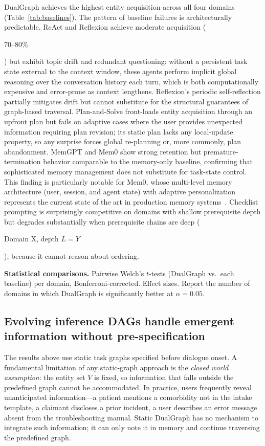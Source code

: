 \documentclass[11pt,a4paper]{article}
\newcommand{\placeholder}[1]{%
  \begin{tcolorbox}[colback=yellow!10,colframe=orange!60!black,
    fonttitle=\bfseries,title=Placeholder]
    #1
  \end{tcolorbox}%
}
\begin{document}
DualGraph achieves the highest entity acquisition across all four domains
(Table~\ref{tab:baselines}). The pattern of baseline failures is
architecturally predictable.
ReAct and Reflexion achieve moderate acquisition (\placeholder{70--80\%}) but
exhibit topic drift and redundant questioning: without a persistent task
state external to the context window, these agents perform implicit global
reasoning over the conversation history each turn, which is both
computationally expensive and error-prone as context lengthens. Reflexion's
periodic self-reflection partially mitigates drift but cannot substitute for
the structural guarantees of graph-based traversal.
Plan-and-Solve front-loads entity acquisition through an upfront plan but
fails on adaptive cases where the user provides unexpected information
requiring plan revision; its static plan lacks any local-update property,
so any surprise forces global re-planning or, more commonly, plan
abandonment.
MemGPT and Mem0 show strong retention but premature-termination behavior
comparable to the memory-only baseline, confirming that sophisticated memory
management does not substitute for task-state control. This finding is
particularly notable for Mem0, whose multi-level memory architecture
(user, session, and agent state) with adaptive personalization represents
the current state of the art in production memory
systems~\cite{mem0_2025}.
Checklist prompting is surprisingly competitive on domains with shallow
prerequisite depth but degrades substantially when prerequisite chains are
deep (\placeholder{Domain X, depth $L = Y$}), because it cannot reason about
ordering.

\placeholder{%
  \textbf{Statistical comparisons.} Pairwise Welch's $t$-tests (DualGraph
  vs.\ each baseline) per domain, Bonferroni-corrected. Effect sizes.
  Report the number of domains in which DualGraph is significantly better
  at $\alpha = 0.05$.
}


\subsection{Evolving inference DAGs handle emergent information without
pre-specification}
\label{sec:results_evolving}

The results above use static task graphs specified before dialogue onset.
A fundamental limitation of any static-graph approach is the \emph{closed
world assumption}: the entity set $V$ is fixed, so information that falls
outside the predefined graph cannot be accommodated. In practice, users
frequently reveal unanticipated information---a patient mentions a
comorbidity not in the intake template, a claimant discloses a prior
incident, a user describes an error message absent from the troubleshooting
manual. Static DualGraph has no mechanism to integrate such information;
it can only note it in memory and continue traversing the predefined graph.
\end{document}
